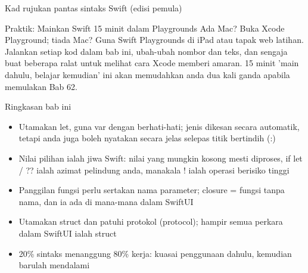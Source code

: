 \begin{center}\small\color{gray}Kad rujukan pantas sintaks Swift (edisi pemula)\end{center}

\begin{tcbpractice}{Praktik: Mainkan Swift 15 minit dalam Playgrounds}
Ada Mac? Buka Xcode Playground; tiada Mac? Guna Swift Playgrounds di iPad atau tapak web latihan. Jalankan setiap kod dalam bab ini, ubah-ubah nombor dan teks, dan sengaja buat beberapa ralat untuk melihat cara Xcode memberi amaran. 15 minit 'main dahulu, belajar kemudian' ini akan memudahkan anda dua kali ganda apabila memulakan Bab 62.

\end{tcbpractice}

\begin{tcbsummary}{Ringkasan bab ini}
\begin{itemize}
  \item Utamakan let, guna var dengan berhati-hati; jenis dikesan secara automatik, tetapi anda juga boleh nyatakan secara jelas selepas titik bertindih (:)
  \item Nilai pilihan ialah jiwa Swift: nilai yang mungkin kosong mesti diproses, if let / ?? ialah azimat pelindung anda, manakala ! ialah operasi berisiko tinggi
  \item Panggilan fungsi perlu sertakan nama parameter; closure = fungsi tanpa nama, dan ia ada di mana-mana dalam SwiftUI
  \item Utamakan struct dan patuhi protokol (protocol); hampir semua perkara dalam SwiftUI ialah struct
  \item 20\% sintaks menanggung 80\% kerja: kuasai penggunaan dahulu, kemudian barulah mendalami
\end{itemize}

\end{tcbsummary}
